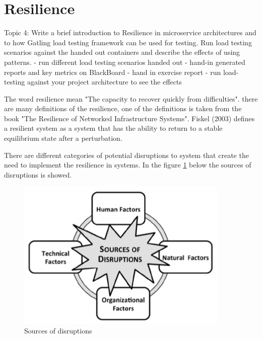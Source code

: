 \chapter{Resilience}\label{ch:resilience}
Topic 4: Write a brief introduction to Resilience in microservice architectures and to how Gatling load testing framework can be used for testing. Run load testing scenarios against the handed out containers and describe the effects of using patterns.
- run different load testing scenarios handed out
- hand-in generated reports and key metrics on BlackBoard 
- hand in exercise report
- run load-testing against your project architecture to see the effects

The word resilience mean "The capacity to recover quickly from difficulties". there are many definitions of the resilience, one of the definitions is taken from the book "The Resilience of Networked Infrastructure Systems". Fiskel (2003) defines a resilient system as a system that has the ability to return to a stable equilibrium state after a perturbation. 

There are different categories of potential disruptions to system that create the need to implement the resilience in systems. In the figure \ref{ch:resilience} below the sources of disruptions is showed. 
\begin{figure}[bth]
	\includegraphics[width=0.7\linewidth]{gfx/resilience}
	\caption[routingtable]{Sources of disruptions} \label{fig:resilience}
\end{figure}   

